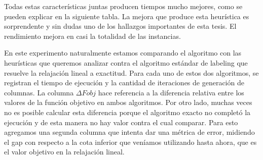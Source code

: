 Todas estas características juntas producen tiempos mucho mejores, como se pueden explicar en la siguiente tabla. La mejora que produce esta heurística es sorprendente y sin dudas uno de los hallazgos importantes de esta tesis. El rendimiento mejora en casi la totalidad de las instancias.

En este experimento naturalmente estamos comparando el algoritmo con las heurísticas que queremos analizar contra el algoritmo estándar de labeling que resuelve la relajación lineal a exactitud. Para cada uno de estos dos algoritmos, se registran el tiempo de ejecución y la cantidad de iteraciones de generación de columnas. La columna $\Delta Fobj$ hace referencia a la diferencia relativa entre los valores de la función objetivo en ambos algoritmos. Por otro lado, muchas veces no es posible calcular esta diferencia porque el algoritmo exacto no completó la ejecución y de esta manera no hay valor contra el cual comparar. Para esto agregamos una segunda columna que intenta dar una métrica de error, midiendo el gap con respecto a la cota inferior que veníamos utilizando hasta ahora, que es el valor objetivo en la relajación lineal.

